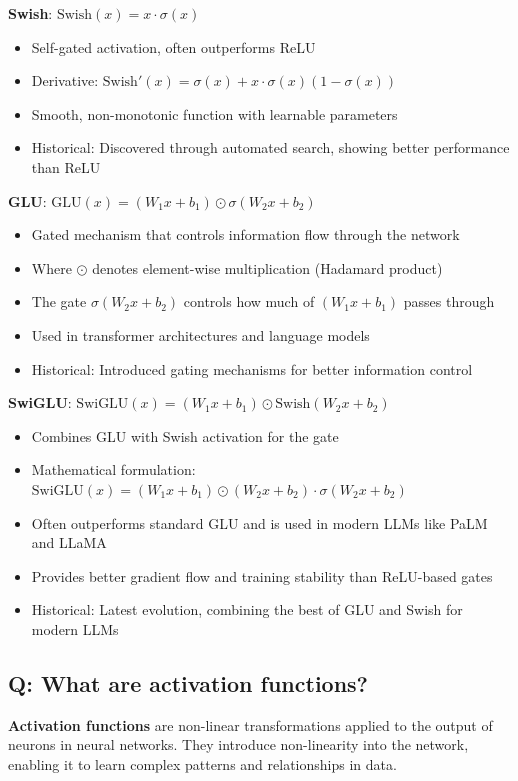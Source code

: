 \textbf{Swish}: $\text{Swish}(x) = x \cdot \sigma(x)$
\begin{itemize}
	\item Self-gated activation, often outperforms ReLU
	\item Derivative: $\text{Swish}'(x) = \sigma(x) + x \cdot \sigma(x)(1 - \sigma(x))$
	\item Smooth, non-monotonic function with learnable parameters
	\item Historical: Discovered through automated search, showing better performance than ReLU
\end{itemize}

\textbf{GLU}: $\text{GLU}(x) = (W_1x + b_1) \odot \sigma(W_2x + b_2)$
\begin{itemize}
	\item Gated mechanism that controls information flow through the network
	\item Where $\odot$ denotes element-wise multiplication (Hadamard product)
	\item The gate $\sigma(W_2x + b_2)$ controls how much of $(W_1x + b_1)$ passes through
	\item Used in transformer architectures and language models
	\item Historical: Introduced gating mechanisms for better information control
\end{itemize}

\textbf{SwiGLU}: $\text{SwiGLU}(x) = (W_1x + b_1) \odot \text{Swish}(W_2x + b_2)$
\begin{itemize}
	\item Combines GLU with Swish activation for the gate
	\item Mathematical formulation: $\text{SwiGLU}(x) = (W_1x + b_1) \odot (W_2x + b_2) \cdot \sigma(W_2x + b_2)$
	\item Often outperforms standard GLU and is used in modern LLMs like PaLM and LLaMA
	\item Provides better gradient flow and training stability than ReLU-based gates
	\item Historical: Latest evolution, combining the best of GLU and Swish for modern LLMs
\end{itemize}

\subsection*{\textcolor{primaryteal}{Q: What are activation functions?}}
\textbf{Activation functions} are non-linear transformations applied to the output of neurons in neural networks. They introduce non-linearity into the network, enabling it to learn complex patterns and relationships in data.

